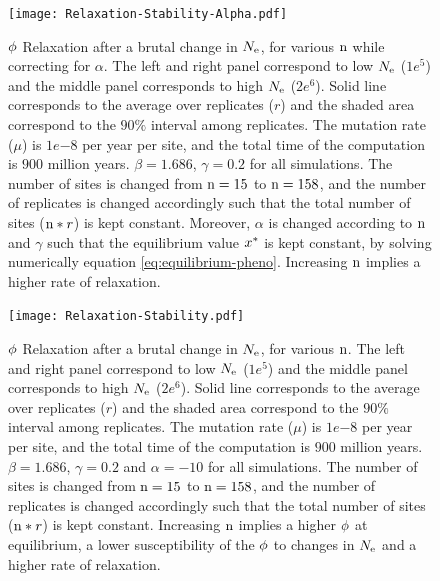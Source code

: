 \begin{figure}[H]
	\centering
	\texttt{[image: Relaxation-Stability-Alpha.pdf]}
	\caption[Relaxation time of $\avgpfix$ dependence on $\Nsites$, while correction for $\alpha$]{
	$\avgpfix$ Relaxation after a brutal change in $N_{\mathrm{e}}$, for various $\Nsites$ while correcting for $\alpha$.
	The left and right panel correspond to low $N_{\mathrm{e}}$ ($1e^{5}$) and the middle panel corresponds to high $N_{\mathrm{e}}$ ($2e^{6}$).
	Solid line corresponds to the average over replicates ($r$) and the shaded area correspond to the $90\%$ interval among replicates.
	The mutation rate ($\mu$) is $1e{-8}$ per year per site, and the total time of the computation is $900$ million years.
	$\beta=1.686$, $\gamma=0.2$ for all simulations. The number of sites is changed from $\text{n}=15$ to $\text{n}=158$, and the number of replicates is changed accordingly such that the total number of sites ($\text{n}*r$) is kept constant.
	Moreover, $\alpha$ is changed according to $\text{n}$ and $\gamma$ such that the equilibrium value $x^{*}$ is kept constant, by solving numerically equation \ref{eq:equilibrium-pheno}.
	Increasing $\text{n}$ implies a higher rate of relaxation.}
\end{figure}

\begin{figure}[H]
	\centering
	\texttt{[image: Relaxation-Stability.pdf]}
	\caption[Relaxation time of $\avgpfix$ dependence on $\Nsites$]{
	$\avgpfix$ Relaxation after a brutal change in $N_{\mathrm{e}}$, for various $\Nsites$.
	The left and right panel correspond to low $N_{\mathrm{e}}$ ($1e^{5}$) and the middle panel corresponds to high $N_{\mathrm{e}}$ ($2e^{6}$).
	Solid line corresponds to the average over replicates ($r$) and the shaded area correspond to the $90\%$ interval among replicates.
	The mutation rate ($\mu$) is $1e{-8}$ per year per site, and the total time of the computation is $900$ million years.
	$\beta=1.686$, $\gamma=0.2$ and $\alpha=-10$ for all simulations. The number of sites is changed from $\text{n}=15$ to $\text{n}=158$, and the number of replicates is changed accordingly such that the total number of sites ($\text{n}*r$) is kept constant.
	Increasing $\text{n}$ implies a higher $\avgpfix$ at equilibrium, a lower susceptibility of the $\avgpfix$ to changes in $N_{\mathrm{e}}$ and a higher rate of relaxation.
	}
\end{figure}

